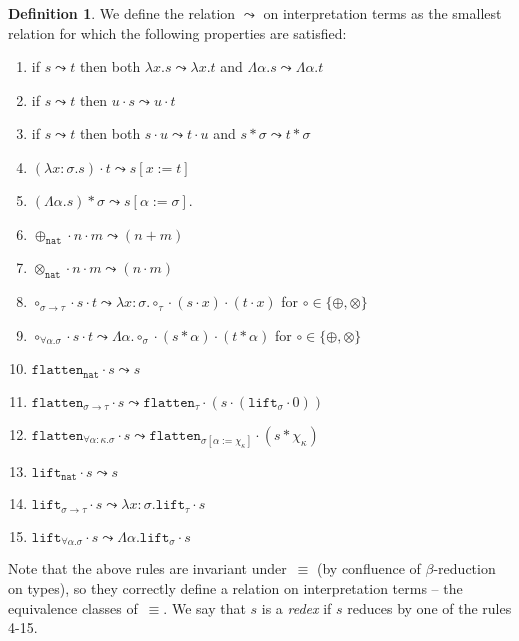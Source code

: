 \documentclass[a4paper,UKenglish,cleveref,autoref,numberwithinsect]{lipics-v2019}
\theoremstyle{definition}
\newtheorem{defn}[theorem]{Definition}
\newcommand{\arrtype}{\rightarrow}
\newcommand{\quant}[2]{\forall #1.#2}
\newcommand{\app}[2]{#1 \cdot #2}
\newcommand{\tapp}[2]{#1 * #2}
\newcommand{\subst}[2]{#1:=#2}
\newcommand{\abs}[2]{\lambda #1.#2}
\newcommand{\tabs}[2]{\Lambda #1.#2}
\newcommand{\arrW}{\leadsto}
\newcommand{\nat}{\mathtt{nat}}
\newcommand{\flatten}{\mathtt{flatten}}
\newcommand{\lift}{\mathtt{lift}}
\begin{document}
\begin{defn}
  We define the relation $\arrW$ on interpretation terms as the
  smallest relation for which the following properties are satisfied:
  \begin{enumerate}
  \item\label{arrW:mono:abs}
    if $s \arrW t$ then both $\abs{x}{s} \arrW \abs{x}{t}$ and
    $\tabs{\alpha}{s} \arrW \tabs{\alpha}{t}$
  \item\label{arrW:mono:right}
    if $s \arrW t$ then $\app{u}{s} \arrW \app{u}{t}$
  \item\label{arrW:mono:left}
    if $s \arrW t$ then both $\app{s}{u} \arrW \app{t}{u}$ and
    $\tapp{s}{\sigma} \arrW \tapp{t}{\sigma}$
  \item\label{arrW:beta:abs} $\app{(\abs{x:\sigma}{s})}{t} \arrW
    s[\subst{x}{t}]$
  \item\label{arrW:beta:tabs} $\tapp{(\tabs{\alpha}{s})}{\sigma}
    \arrW s[\subst{\alpha}{\sigma}]$.
  \item\label{arrW:plus:base}
    $\app{\app{\oplus_{\nat}}{n}}{m} \arrW (n+m)$
  \item\label{arrW:times:base} $\app{\app{\otimes_{\nat}}{n}}{m}
    \arrW (n \cdot m)$
  \item\label{arrW:circ:arrow} $\app{\app{\circ_{\sigma \arrtype
        \tau}}{s}}{t} \arrW
    \abs{x:\sigma}{\app{\app{\circ_\tau}{(\app{s}{x})}}{(\app{t}{x})}}$
    for $\circ \in \{ \oplus, \otimes \}$
  \item\label{arrW:circ:forall}
    $\app{\app{\circ_{\quant{\alpha}{\sigma}}}{s}}{t} \arrW
    \tabs{\alpha}{\app{\app{\circ_\sigma}{(\tapp{s}{\alpha})}}{(
        \tapp{t}{\alpha})}}$ for $\circ \in \{ \oplus, \otimes \}$
  \item $\app{\flatten_\nat}{s} \arrW s$
  \item $\app{\flatten_{\sigma \arrtype \tau}}{s} \arrW
    \app{\flatten_\tau}{(\app{s}{(\app{\lift_\sigma}{0})})}$
  \item $\app{\flatten_{\quant{\alpha:\kappa}{\sigma}}}{s} \arrW
    \app{\flatten_{\sigma[\subst{\alpha}{\chi_\kappa}]}}{(\tapp{s}{\chi_\kappa})}$
  \item $\app{\lift_\nat}{s} \arrW s$
  \item $\app{\lift_{\sigma \arrtype \tau}}{s} \arrW
    \abs{x:\sigma}{\app{\lift_{\tau}}{s}}$
  \item $\app{\lift_{\quant{\alpha}{\sigma}}}{s} \arrW
    \tabs{\alpha}{\app{\lift_{\sigma}}{s}}$
  \end{enumerate}
  Note that the above rules are invariant under~$\equiv$ (by
  confluence of $\beta$-reduction on types), so they correctly define
  a relation on interpretation terms -- the equivalence classes
  of~$\equiv$. We say that $s$ is a \emph{redex} if $s$ reduces by one
  of the rules 4-15.


\end{defn}
\end{document}
